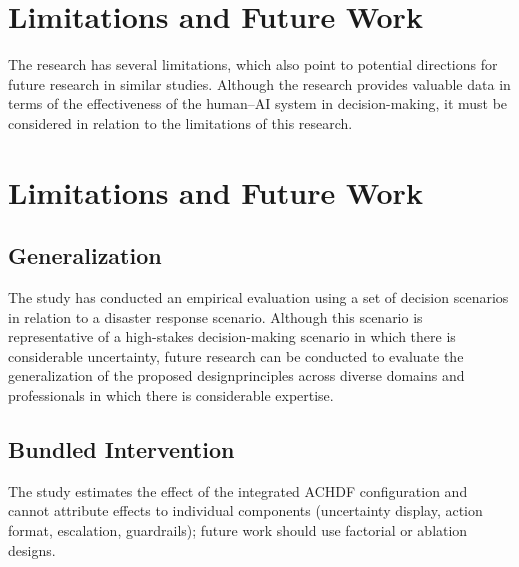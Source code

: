 \documentclass[journal]{IEEEtran}
\theoremstyle{plain}
\theoremstyle{definition}
\providecommand{\DIFaddtex}[1]{{\protect\color{blue} \sf #1}} %
\providecommand{\DIFdeltex}[1]{{\protect\color{red} \scriptsize #1}} %
\providecommand{\DIFaddbegin}{} %
\providecommand{\DIFaddend}{} %
\providecommand{\DIFdelbegin}{} %
\providecommand{\DIFdelend}{} %
\providecommand{\DIFadd}[1]{\texorpdfstring{\DIFaddtex{#1}}{#1}} %
\providecommand{\DIFdel}[1]{\texorpdfstring{\DIFdeltex{#1}}{}} %
\newcommand{\DIFscaledelfig}{0.5}
\newlength{\DIFdelgraphicswidth} %
\newlength{\DIFdelgraphicsheight} %
\newcommand{\DIFaddincludegraphics}[2][]{{\color{blue}\fbox{\DIFOincludegraphics[#1]{#2}}}} %
\newcommand{\DIFdelincludegraphics}[2][]{%
\sbox{\DIFdelgraphicsbox}{\DIFOincludegraphics[#1]{#2}}%
\settoboxwidth{\DIFdelgraphicswidth}{\DIFdelgraphicsbox} %
\settoboxtotalheight{\DIFdelgraphicsheight}{\DIFdelgraphicsbox} %
\scalebox{\DIFscaledelfig}{%
\parbox[b]{\DIFdelgraphicswidth}{\usebox{\DIFdelgraphicsbox}\\[-\baselineskip] \rule{\DIFdelgraphicswidth}{0em}}\llap{\resizebox{\DIFdelgraphicswidth}{\DIFdelgraphicsheight}{%
\setlength{\unitlength}{\DIFdelgraphicswidth}%
\begin{picture}(1,1)%
\thicklines\linethickness{2pt} %
{\color[rgb]{1,0,0}\put(0,0){\framebox(1,1){}}}%
{\color[rgb]{1,0,0}\put(0,0){\line( 1,1){1}}}%
{\color[rgb]{1,0,0}\put(0,1){\line(1,-1){1}}}%
\end{picture}%
}\hspace*{3pt}}} %
} %
\DeclareRobustCommand{\DIFaddbegin}{\DIFOaddbegin \let\includegraphics\DIFaddincludegraphics} %
\DeclareRobustCommand{\DIFaddend}{\DIFOaddend \let\includegraphics\DIFOincludegraphics} %
\DeclareRobustCommand{\DIFdelbegin}{\DIFOdelbegin \let\includegraphics\DIFdelincludegraphics} %
\DeclareRobustCommand{\DIFdelend}{\DIFOaddend \let\includegraphics\DIFOincludegraphics} %
\begin{document}
    \DIFdelbegin \section{\DIFdel{Limitations and Future Work}}
\addtocounter{section}{-1}%
\DIFdel{The research has several limitations, which also point to potential directions for future research in similar studies.
        Although the research provides valuable data in terms of the effectiveness of the human--AI system in decision-making, it must be considered in relation to the limitations of this research. }\DIFdelend \DIFaddbegin \section{\DIFadd{Limitations and Future Work}}
    \label{sec:limitations}
\DIFaddend 

    \DIFdelbegin \subsection{\DIFdel{Generalization}}
\addtocounter{subsection}{-1}%
\DIFdel{The study has conducted an empirical evaluation using a set of decision scenarios in relation to a disaster response scenario. Although this scenario is representative of a high-stakes decision-making scenario in which there is considerable uncertainty, future research can be conducted to evaluate the generalization of the proposed designprinciples across diverse domains and professionals in which there is considerable expertise. }\DIFdelend \DIFaddbegin \subsection{\DIFadd{Bundled Intervention}}
    \DIFadd{The study estimates the effect of the integrated ACHDF configuration and cannot attribute effects to individual components (uncertainty display, action format, escalation, guardrails); future work should use factorial or ablation designs.
}\DIFaddend 
\end{document}
